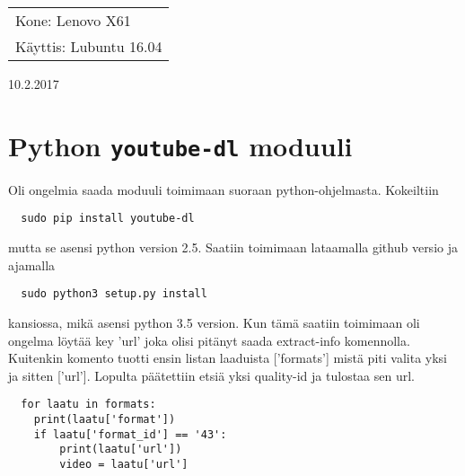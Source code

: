 \documentclass[main.tex]{subfiles}
\begin{document}
\thispagestyle{empty}
\begin{tabular}[t]{l}
Kone: Lenovo X61\\
Käyttis: Lubuntu 16.04
\end{tabular}
\hfill 10.2.2017

\section{Python \texttt{youtube-dl} moduuli}

Oli ongelmia saada moduuli toimimaan suoraan python-ohjelmasta. Kokeiltiin 

\begin{lstlisting}
  sudo pip install youtube-dl
\end{lstlisting}

mutta se asensi python version 2.5. Saatiin toimimaan lataamalla github versio ja ajamalla

\begin{lstlisting}
  sudo python3 setup.py install
\end{lstlisting}

kansiossa, mikä asensi python 3.5 version. Kun tämä saatiin toimimaan oli ongelma löytää key 'url' joka olisi pitänyt saada extract-info komennolla. Kuitenkin komento tuotti ensin listan laaduista ['formats'] mistä piti valita yksi ja sitten ['url']. Lopulta päätettiin etsiä yksi quality-id ja tulostaa sen url.

\begin{lstlisting}
  for laatu in formats:
  	print(laatu['format'])
  	if laatu['format_id'] == '43':
  		print(laatu['url'])
  		video = laatu['url']\end{lstlisting}
\end{document}
